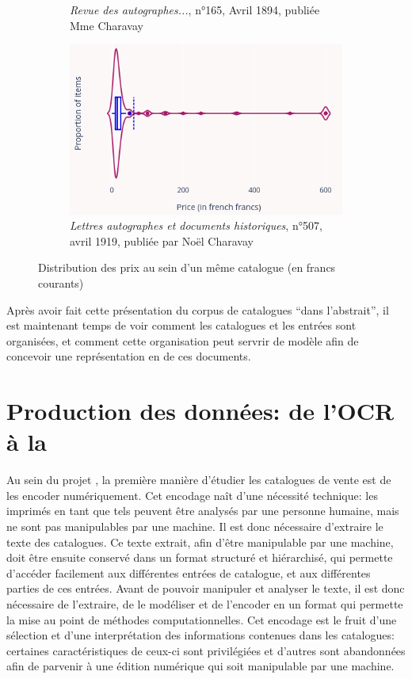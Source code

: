 \begin{figure}[p]
\begin{subfigure}{0.6\textwidth}
		\caption{\textit{Revue des autographes...}, n°165, Avril 1894, publiée Mme Charavay}
		\label{fig:rda165}
	\end{subfigure}
	\begin{subfigure}{0.6\textwidth}
		\includegraphics[width=\textwidth]{img/lad507_distrib.png}
		\caption{\textit{Lettres autographes et documents historiques}, n°507, avril 1919, publiée par Noël Charavay}
	\end{subfigure}
	\caption{Distribution des prix au sein d'un même catalogue (en francs courants)}
	\label{fig:violin}
\end{figure}

Après avoir fait cette présentation du corpus de catalogues \enquote{dans l'abstrait}, il est maintenant temps de voir comment les catalogues et les entrées sont organisées, et comment cette organisation peut servrir de modèle afin de concevoir une représentation en \xmltei{} de ces documents.

\chapter{Production des données: de l'OCR à la \tei{}}
Au sein du projet \mssktb{}, la première manière d'étudier les catalogues de vente est de les encoder numériquement. Cet encodage naît d'une nécessité technique: les imprimés en tant que tels peuvent être analysés par une personne humaine, mais ne sont pas manipulables par une machine. Il est donc nécessaire d'extraire le texte des catalogues. Ce texte extrait, afin d'être manipulable par une machine, doit être ensuite conservé dans un format structuré et hiérarchisé, qui permette d'accéder facilement aux différentes entrées de catalogue, et aux différentes parties de ces entrées. Avant de pouvoir manipuler et analyser le texte, il est donc nécessaire de l'extraire, de le modéliser et de l'encoder en un format qui permette la mise au point de méthodes computationnelles. Cet encodage est le fruit d'une sélection et d'une interprétation des informations contenues dans les catalogues: certaines caractéristiques de ceux-ci sont privilégiées et d'autres sont abandonnées afin de parvenir à une édition numérique qui soit manipulable par une machine.

